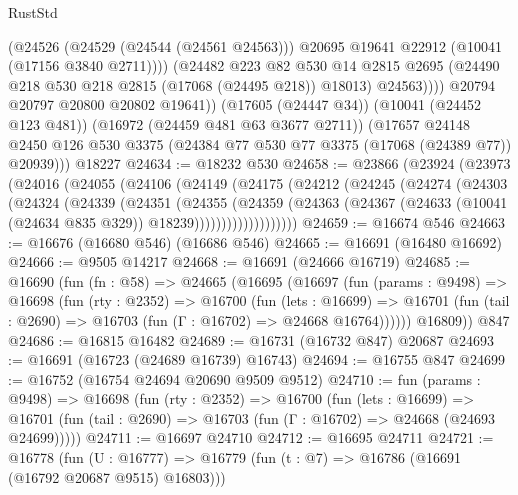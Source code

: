 \begin{lexlean}{RustStd}
\begin{coremodule}
                  (@24526
                    (@24529 (@24544 (@24561 @24563)))
                    @20695
                    @19641
                    @22912
                    (@10041 (@17156 @3840 @2711))))
                (@24482
                  @223
                  @82
                  @530
                  @14
                  @2815
                  @2695
                  (@24490 @218 @530 @218 @2815 (@17068 (@24495 @218)) @18013)
                  @24563))))
          @20794
          @20797
          @20800
          @20802
          @19641))
      (@17605 (@24447 @34))
      (@10041 (@24452 @123 @481))
      (@16972 (@24459 @481 @63 @3677 @2711))
      (@17657
        @24148
        @2450
        @126
        @530
        @3375
        (@24384 @77 @530 @77 @3375 (@17068 (@24389 @77)) @20939)))
    @18227
@24634 := @18232 @530
@24658 := @23866
    (@23924
      (@23973
        (@24016
          (@24055
            (@24106
              (@24149
                (@24175
                  (@24212
                    (@24245
                      (@24274
                        (@24303
                          (@24324
                            (@24339
                              (@24351
                                (@24355
                                  (@24359
                                    (@24363
                                      (@24367
                                        (@24633
                                          (@10041 (@24634 @835 @329))
                                          @18239)))))))))))))))))))
@24659 := @16674 @546
@24663 := @16676 (@16680 @546) (@16686 @546)
@24665 := @16691 (@16480 @16692)
@24666 := @9505 @14217
@24668 := @16691 (@24666 @16719)
@24685 := @16690
    (fun (fn : @58) =>
    @24665
      (@16695
        (@16697
          (fun (params : @9498) =>
          @16698
            (fun (rty : @2352) =>
            @16700
              (fun (lets : @16699) =>
              @16701 (fun (tail : @2690) => @16703 (fun (Γ : @16702) => @24668 @16764))))))
        @16809))
    @847
@24686 := @16815 @16482
@24689 := @16731 (@16732 @847) @20687
@24693 := @16691 (@16723 (@24689 @16739) @16743)
@24694 := @16755 @847
@24699 := @16752 (@16754 @24694 @20690 @9509 @9512)
@24710 := fun (params : @9498) =>
  @16698
    (fun (rty : @2352) =>
    @16700
      (fun (lets : @16699) =>
      @16701 (fun (tail : @2690) => @16703 (fun (Γ : @16702) => @24668 (@24693 @24699)))))
@24711 := @16697 @24710
@24712 := @16695 @24711
@24721 := @16778
    (fun (U : @16777) => @16779 (fun (t : @7) => @16786 (@16691 (@16792 @20687 @9515) @16803)))

\end{coremodule}
\end{lexlean}
